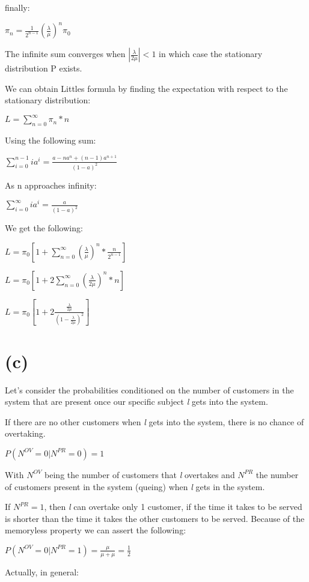 \documentclass[]{article}
\begin{document}
finally:

\(\pi_n = \frac{1}{2^{n-1}} (\frac{\lambda}{\mu})^{n} \pi_0\)

The infinite sum converges when \(|\frac{\lambda}{2 \mu}| < 1\) in which
case the stationary distribution P exists.

We can obtain Littles formula by finding the expectation with respect to
the stationary distribution:

\(L = \sum_{n=0}^{\infty} \pi_n * n\)

Using the following sum:

\(\sum_{i=0}^{n-1} i a^i = \frac{a - na^n + (n-1)a^{n+1}}{(1-a)^2}\)

As n approaches infinity:

\(\sum_{i=0}^{\infty} i a^i = \frac{a}{(1-a)^2}\)

We get the following:

\(L = \pi_0 [1 + \sum_{n=0}^{\infty} (\frac{\lambda}{\mu})^n * \frac{n}{2^{n-1}}]\)

\(L = \pi_0 [1 + 2 \sum_{n=0}^{\infty} (\frac{\lambda}{2 \mu})^n * n]\)

\(L = \pi_0 [1 + 2 \frac{\frac{\lambda}{2 \mu}}{(1 - \frac{\lambda}{2 \mu})^2}]\)

\hypertarget{c-1}{%
\section{(c)}\label{c-1}}

Let's consider the probabilities conditioned on the number of customers
in the system that are present once our specific subject \emph{l} gets
into the system.

If there are no other customers when \emph{l} gets into the system,
there is no chance of overtaking.

\(P(N^{OV} = 0 | N^{PR} = 0) = 1\)

With \(N^{OV}\) being the number of customers that \emph{l} overtakes
and \(N^{PR}\) the number of customers present in the system (queing)
when \emph{l} gets in the system.

If \(N^{PR} = 1\), then \emph{l} can overtake only 1 customer, if the
time it takes to be served is shorter than the time it takes the other
customers to be served. Because of the memoryless property we can assert
the following:

\(P(N^{OV} = 0 | N^{PR} = 1) = \frac{\mu}{\mu + \mu} = \frac{1}{2}\)

Actually, in general:
\end{document}
